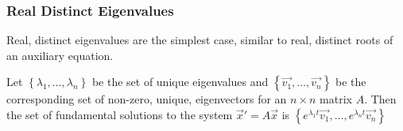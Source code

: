 \subsubsection{Real Distinct Eigenvalues}
\noindent
Real, distinct eigenvalues are the simplest case, similar to real, distinct roots of an auxiliary equation.
\begin{theorem}
	Let $\left\{\lambda_1, \ldots, \lambda_n\right\}$ be the set of unique eigenvalues and $\left\{\vec{v_1}, \ldots, \vec{v_n}\right\}$ be the corresponding set of non-zero, unique, eigenvectors for an $n \times n$ matrix $A$. Then the set of fundamental solutions to the system $\vec{x}' = A\vec{x}$ is $\left\{e^{\lambda_1 t}\vec{v_1}, \ldots, e^{\lambda_n t}\vec{v_n} \right\}$
\end{theorem}

\ifodd{}\fi